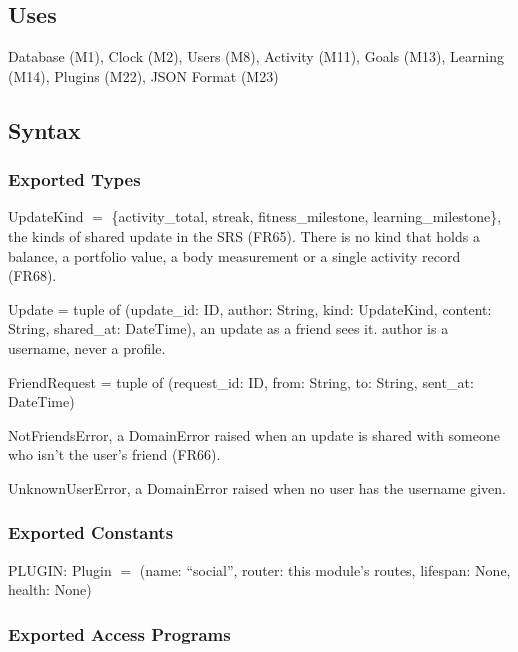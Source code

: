 \documentclass[12pt, titlepage]{article}
\begin{document}
\subsection{Uses}

Database (M1), Clock (M2), Users (M8), Activity (M11), Goals (M13), Learning
(M14), Plugins (M22), JSON Format (M23)

\subsection{Syntax}

\subsubsection{Exported Types}

\noindent UpdateKind $=$ \{activity\_total, streak, fitness\_milestone,
learning\_milestone\}, the kinds of shared update in the SRS (FR65). There is
no kind that holds a balance, a portfolio value, a body measurement or a
single activity record (FR68).

\medskip
\noindent Update = tuple of (update\_id: ID, author: String, kind:
UpdateKind, content: String, shared\_at: DateTime), an update as a friend sees
it. author is a username, never a profile.

\medskip
\noindent FriendRequest = tuple of (request\_id: ID, from: String, to:
String, sent\_at: DateTime)

\medskip
\noindent NotFriendsError, a DomainError raised when an update is shared with
someone who isn't the user's friend (FR66).

\medskip
\noindent UnknownUserError, a DomainError raised when no user has the
username given.

\subsubsection{Exported Constants}

\noindent PLUGIN: Plugin $=$ (name: ``social'', router: this module's routes,
lifespan: None, health: None)

\subsubsection{Exported Access Programs}
\end{document}
